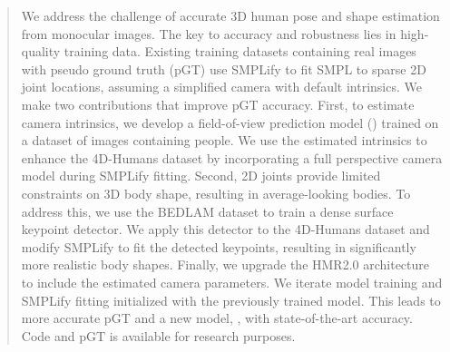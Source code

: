 \begin{abstract}
We address the challenge of accurate 3D human pose and shape estimation from monocular images. The key to accuracy and robustness lies in high-quality training data. Existing training datasets containing real images with pseudo ground truth (pGT) use SMPLify to fit SMPL to sparse 2D joint locations, assuming a simplified camera with default intrinsics. We make two contributions that improve pGT accuracy.
First, to estimate camera intrinsics, we develop a field-of-view prediction model (\cameramodel) trained on a dataset of images containing people. We use the estimated intrinsics to enhance the 4D-Humans dataset by incorporating a full perspective camera model during SMPLify fitting.
Second, 2D joints provide limited constraints on 3D body shape, resulting in average-looking bodies. To address this, we use the BEDLAM dataset to train a dense surface keypoint detector. We apply this detector to the 4D-Humans dataset and modify SMPLify to fit the detected keypoints, resulting in significantly more realistic body shapes.
Finally, we upgrade the HMR2.0 architecture to include the estimated camera parameters. 
We iterate model training and SMPLify fitting initialized with the previously trained model. 
This leads to more accurate pGT and a new model, \hpsmodel, with state-of-the-art accuracy. 
Code and pGT is available for research purposes.
\end{abstract}
